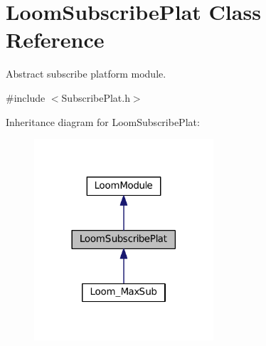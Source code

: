 \hypertarget{class_loom_subscribe_plat}{}\section{Loom\+Subscribe\+Plat Class Reference}
\label{class_loom_subscribe_plat}


Abstract subscribe platform module.  




{\ttfamily \#include $<$Subscribe\+Plat.\+h$>$}



Inheritance diagram for Loom\+Subscribe\+Plat\+:\nopagebreak
\begin{figure}[H]
\begin{center}
\leavevmode
\includegraphics[width=189pt]{class_loom_subscribe_plat__inherit__graph}
\end{center}
\end{figure}
